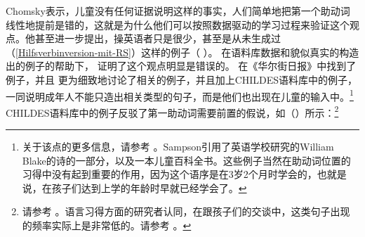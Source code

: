 \zl
Chomsky表示，儿童没有任何证据说明这样的事实，人们简单地把第一个助动词线性地提前是错的，这就是为什么他们可以按照数据驱动的学习过程来验证这个观点。他甚至进一步提出，操英语者只是很少，甚至是从未生成过（\ref{Hilfsverbinversion-mit-RS}）这样的例子（ ）。
在语料库数据和貌似真实的构造出的例子的帮助下， \citet{Pullum96a}证明了这个观点明显是错误的。
  \citet{Pullum96a}在《华尔街日报》中找到了例子，并且 \citet{PS2002a}更为细致地讨论了相关的例子，并且加上CHILDES语料库中的例子，一同说明成年人不能只造出相关类型的句子，而是他们也出现在儿童的输入中。\footnote{%
 关于该点的更多信息，请参考 。Sampson引用了英语学校研究的William Blake的诗的一部分，以及一本儿童百科全书。这些例子当然在助动词位置的习得中没有起到重要的作用，因为这个语序是在3岁2个月时学会的，也就是说，在孩子们达到上学的年龄时早就已经学会了。
 }
CHILDES语料库中的例子反驳了第一助动词需要前置的假说，如（）所示：\footnote{%
请参考 。语言习得方面的研究者认同，在跟孩子们的交谈中，这类句子出现的频率实际上是非常低的。请参考 。
 }
